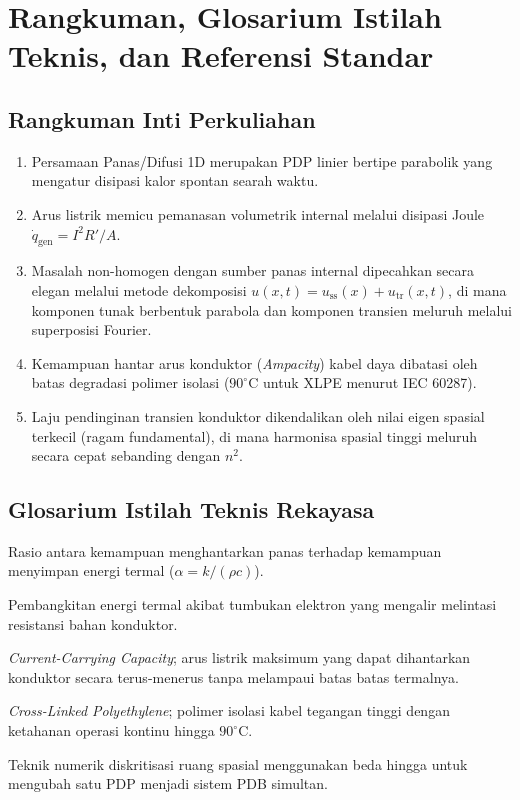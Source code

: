 \documentclass[11pt,a4paper]{article}
\theoremstyle{definition}
\begin{document}
\section{Rangkuman, Glosarium Istilah Teknis, dan Referensi Standar}

\subsection{Rangkuman Inti Perkuliahan}
\begin{enumerate}[leftmargin=*]
    \item Persamaan Panas/Difusi 1D merupakan PDP linier bertipe parabolik yang mengatur disipasi kalor spontan searah waktu.
    \item Arus listrik memicu pemanasan volumetrik internal melalui disipasi Joule $\dot{q}_{\text{gen}} = I^2 R'/A$.
    \item Masalah non-homogen dengan sumber panas internal dipecahkan secara elegan melalui metode dekomposisi $u(x, t) = u_{\text{ss}}(x) + u_{\text{tr}}(x, t)$, di mana komponen tunak berbentuk parabola dan komponen transien meluruh melalui superposisi Fourier.
    \item Kemampuan hantar arus konduktor (\textit{Ampacity}) kabel daya dibatasi oleh batas degradasi polimer isolasi ($90^\circ\text{C}$ untuk XLPE menurut IEC 60287).
    \item Laju pendinginan transien konduktor dikendalikan oleh nilai eigen spasial terkecil (ragam fundamental), di mana harmonisa spasial tinggi meluruh secara cepat sebanding dengan $n^2$.
\end{enumerate}

\subsection{Glosarium Istilah Teknis Rekayasa}
\begin{description}[leftmargin=!,labelwidth=3.5cm]
    \item[Thermal Diffusivity] Rasio antara kemampuan menghantarkan panas terhadap kemampuan menyimpan energi termal ($\alpha = k/(\rho c)$).
    \item[Joule Heating] Pembangkitan energi termal akibat tumbukan elektron yang mengalir melintasi resistansi bahan konduktor.
    \item[Ampacity] \textit{Current-Carrying Capacity}; arus listrik maksimum yang dapat dihantarkan konduktor secara terus-menerus tanpa melampaui batas batas termalnya.
    \item[XLPE] \textit{Cross-Linked Polyethylene}; polimer isolasi kabel tegangan tinggi dengan ketahanan operasi kontinu hingga $90^\circ\text{C}$.
    \item[Method of Lines] Teknik numerik diskritisasi ruang spasial menggunakan beda hingga untuk mengubah satu PDP menjadi sistem PDB simultan.
\end{description}
\end{document}
